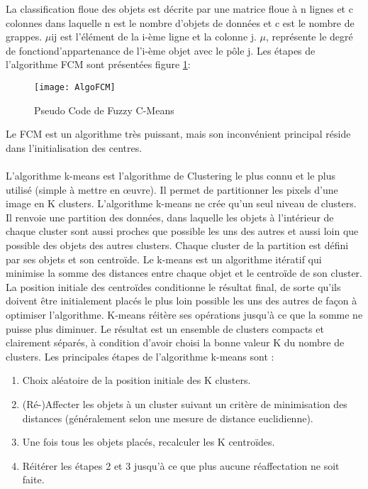 La classification floue des objets est décrite par une matrice floue à n lignes et c colonnes dans laquelle n est le nombre d’objets de données et c est le nombre de grappes. $\mu$ij est l’élément de la i-ème ligne et la colonne j. $\mu$, représente le degré de fonctiond’appartenance de l’i-ème objet avec le pôle j.
Les étapes de l’algorithme FCM sont présentées figure \ref{fig:ALGOFCM}:

\begin{figure}[H]
  \centering
  \texttt{[image: AlgoFCM]}
  \caption{Pseudo Code de Fuzzy C-Means}
  \label{fig:ALGOFCM}
\end{figure}

Le FCM est un algorithme très puissant, mais son inconvénient principal réside dans l’initialisation des centres.

\paragraph{}
L’algorithme k-means est l’algorithme de Clustering le plus connu et le plus utilisé (simple à mettre en œuvre). Il permet de partitionner les pixels d’une image en K clusters. L’algorithme k-means ne crée qu’un seul niveau de clusters. Il renvoie une partition des données, dans laquelle les objets à l’intérieur de chaque cluster sont aussi proches que possible les uns des autres et aussi loin que possible des objets des autres clusters. Chaque cluster de la partition est défini par ses objets et son centroïde. Le k-means est un algorithme itératif qui minimise la somme des distances entre chaque objet et le centroïde de son cluster. La position initiale des centroïdes conditionne le résultat final, de sorte qu'ils doivent être initialement placés le plus loin possible les uns des autres de façon à optimiser l’algorithme. K-means réitère ses opérations jusqu’à ce que la somme ne puisse plus diminuer. Le résultat est un ensemble de clusters compacts et clairement séparés, à condition d’avoir choisi la bonne valeur K du nombre de clusters. Les principales étapes de l’algorithme k-means sont :
\begin{enumerate}
\item Choix aléatoire de la position initiale des K clusters.
\item (Ré-)Affecter les objets à un cluster suivant un critère de minimisation des distances (généralement selon une mesure de distance euclidienne).
\item Une fois tous les objets placés, recalculer les K centroïdes.
\item Réitérer les étapes 2 et 3 jusqu’à ce que plus aucune réaffectation ne soit faite.
\end{enumerate}
